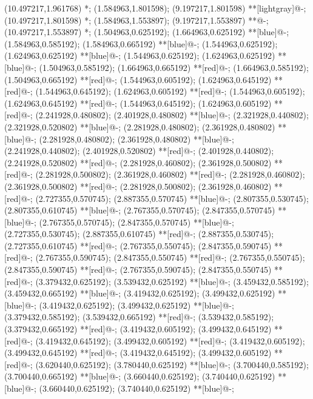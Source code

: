 (10.497217,1.961768) *{};
(1.584963,1.801598); (9.197217,1.801598) **[lightgray]@{-};
(10.497217,1.801598) *{};
(1.584963,1.553897); (9.197217,1.553897) **@{-};
(10.497217,1.553897) *{};
(1.504963,0.625192); (1.664963,0.625192) **[blue]@{-};
(1.584963,0.585192); (1.584963,0.665192) **[blue]@{-};
(1.544963,0.625192); (1.624963,0.625192) **[blue]@{-};
(1.544963,0.625192); (1.624963,0.625192) **[blue]@{-};
(1.504963,0.585192); (1.664963,0.665192) **[red]@{-};
(1.664963,0.585192); (1.504963,0.665192) **[red]@{-};
(1.544963,0.605192); (1.624963,0.645192) **[red]@{-};
(1.544963,0.645192); (1.624963,0.605192) **[red]@{-};
(1.544963,0.605192); (1.624963,0.645192) **[red]@{-};
(1.544963,0.645192); (1.624963,0.605192) **[red]@{-};
(2.241928,0.480802); (2.401928,0.480802) **[blue]@{-};
(2.321928,0.440802); (2.321928,0.520802) **[blue]@{-};
(2.281928,0.480802); (2.361928,0.480802) **[blue]@{-};
(2.281928,0.480802); (2.361928,0.480802) **[blue]@{-};
(2.241928,0.440802); (2.401928,0.520802) **[red]@{-};
(2.401928,0.440802); (2.241928,0.520802) **[red]@{-};
(2.281928,0.460802); (2.361928,0.500802) **[red]@{-};
(2.281928,0.500802); (2.361928,0.460802) **[red]@{-};
(2.281928,0.460802); (2.361928,0.500802) **[red]@{-};
(2.281928,0.500802); (2.361928,0.460802) **[red]@{-};
(2.727355,0.570745); (2.887355,0.570745) **[blue]@{-};
(2.807355,0.530745); (2.807355,0.610745) **[blue]@{-};
(2.767355,0.570745); (2.847355,0.570745) **[blue]@{-};
(2.767355,0.570745); (2.847355,0.570745) **[blue]@{-};
(2.727355,0.530745); (2.887355,0.610745) **[red]@{-};
(2.887355,0.530745); (2.727355,0.610745) **[red]@{-};
(2.767355,0.550745); (2.847355,0.590745) **[red]@{-};
(2.767355,0.590745); (2.847355,0.550745) **[red]@{-};
(2.767355,0.550745); (2.847355,0.590745) **[red]@{-};
(2.767355,0.590745); (2.847355,0.550745) **[red]@{-};
(3.379432,0.625192); (3.539432,0.625192) **[blue]@{-};
(3.459432,0.585192); (3.459432,0.665192) **[blue]@{-};
(3.419432,0.625192); (3.499432,0.625192) **[blue]@{-};
(3.419432,0.625192); (3.499432,0.625192) **[blue]@{-};
(3.379432,0.585192); (3.539432,0.665192) **[red]@{-};
(3.539432,0.585192); (3.379432,0.665192) **[red]@{-};
(3.419432,0.605192); (3.499432,0.645192) **[red]@{-};
(3.419432,0.645192); (3.499432,0.605192) **[red]@{-};
(3.419432,0.605192); (3.499432,0.645192) **[red]@{-};
(3.419432,0.645192); (3.499432,0.605192) **[red]@{-};
(3.620440,0.625192); (3.780440,0.625192) **[blue]@{-};
(3.700440,0.585192); (3.700440,0.665192) **[blue]@{-};
(3.660440,0.625192); (3.740440,0.625192) **[blue]@{-};
(3.660440,0.625192); (3.740440,0.625192) **[blue]@{-};

